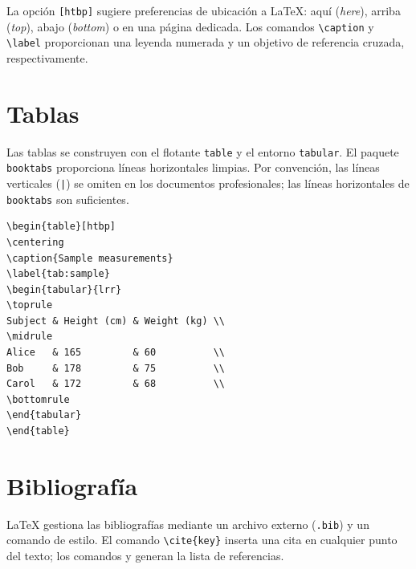 La opción \texttt{[htbp]} sugiere preferencias de ubicación a
\LaTeX{}: aquí (\emph{here}), arriba (\emph{top}), abajo
(\emph{bottom}) o en una página dedicada. Los comandos
\verb|\caption| y \verb|\label| proporcionan una leyenda numerada y un
objetivo de referencia cruzada, respectivamente.

\section{Tablas}
\label{sec:latex-tables}

Las tablas se construyen con el flotante \texttt{table} y el entorno
\texttt{tabular}. El paquete \texttt{booktabs} proporciona líneas
horizontales limpias. Por convención, las líneas verticales
(\texttt{|}) se omiten en los documentos profesionales; las líneas
horizontales de \texttt{booktabs} son suficientes.

\begin{lstlisting}[style=inlineStyle, caption={Una tabla mínima con booktabs}]
\begin{table}[htbp]
\centering
\caption{Sample measurements}
\label{tab:sample}
\begin{tabular}{lrr}
\toprule
Subject & Height (cm) & Weight (kg) \\
\midrule
Alice   & 165         & 60          \\
Bob     & 178         & 75          \\
Carol   & 172         & 68          \\
\bottomrule
\end{tabular}
\end{table}
\end{lstlisting}

\section{Bibliografía}
\label{sec:latex-bibliography}

\LaTeX{} gestiona las bibliografías mediante un archivo externo
(\texttt{.bib}) y un comando de estilo. El comando \verb|\cite{key}|
inserta una cita en cualquier punto del texto; los comandos
\verb|| y \verb||
generan la lista de referencias.

